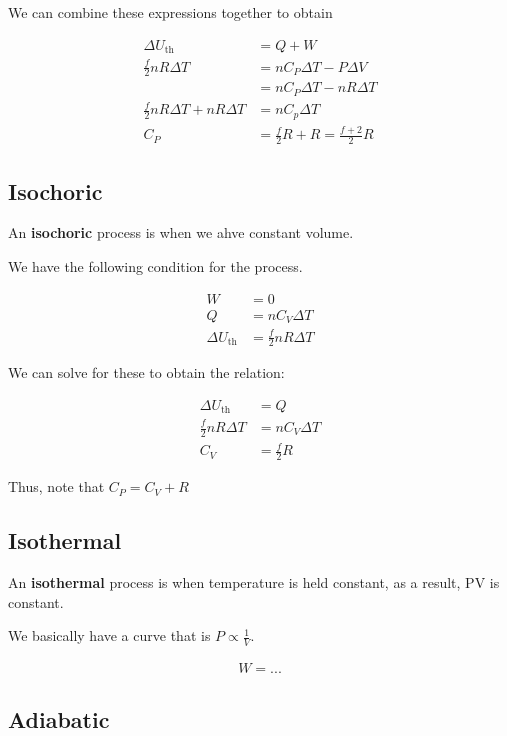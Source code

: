 We can combine these expressions together to obtain

\begin{align}
	\Delta U_\mathrm{th} &= Q + W\\
	\frac{f}{2}nR\Delta T &= nC_P \Delta T - P \Delta V\\
	&= nC_P\Delta T - nR\Delta T\\
	\frac{f}{2}nR\Delta T + nR \Delta T &= nC_p\Delta T\\
	C_P &= \frac{f}{2} R + R = \frac{f + 2}{2}R
\end{align}

\subsection{Isochoric}

An \textbf{isochoric} process is when we ahve constant volume.

We have the following condition for the process.

\begin{align}
	W &= 0\\
	Q &= nC_V\Delta T\\
	\Delta U_\mathrm{th} &= \frac{f}{2} nR\Delta T
\end{align}

We can solve for these to obtain the relation:

\begin{align}
	\Delta U_\mathrm{th} &= Q\\
	\frac{f}{2}nR\Delta T &= nC_V\Delta T\\
	C_V &= \frac{f}{2} R
\end{align}

Thus, note that $C_P = C_V + R$

\subsection{Isothermal}

An \textbf{isothermal} process is when temperature is held constant, as a result, PV is constant.

We basically have a curve that is $P \propto \frac{1}{V}$.


\begin{align}
	W = ...
\end{align}

\subsection{Adiabatic}

